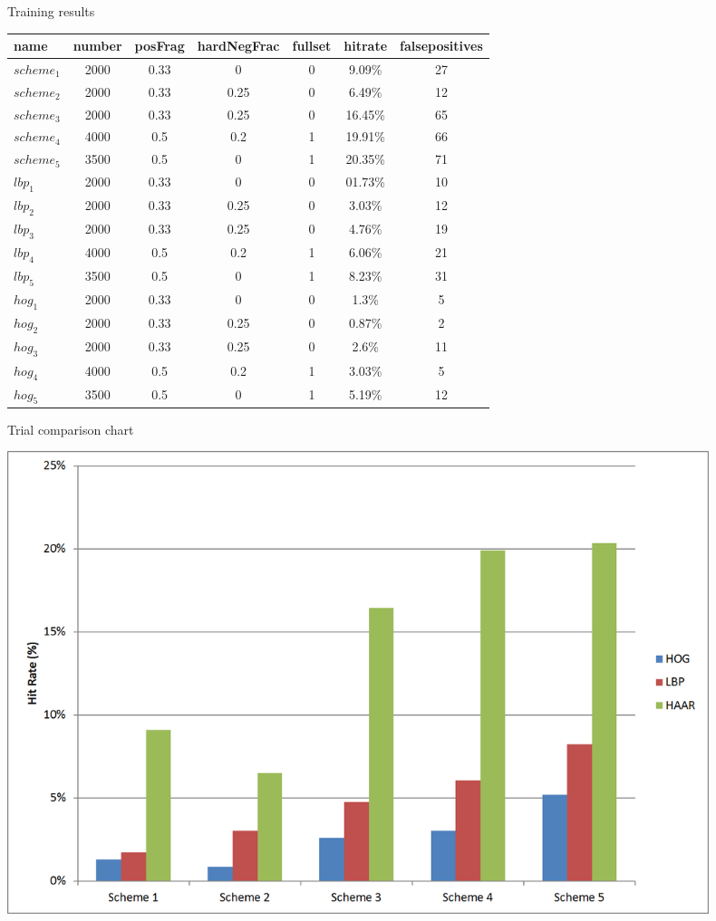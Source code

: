 \documentclass{beamer}
\begin{document}
\begin{frame}{Training results}
	\begin{table}[H]
		\footnotesize
		\centering
		\begin{tabularx}{\textwidth}{lcccccc}
			\toprule
			\textbf{name} & \textbf{number} & \textbf{posFrag} & 
			\textbf{hardNegFrac} & \textbf{fullset} &
			  \textbf{hitrate} & \textbf{falsepositives} \\
			\midrule
			\(scheme_1\) & 2000 & 0.33 	& 0 	& 0	& 9.09\% 	& 27 	\\
			\(scheme_2\) & 2000 & 0.33 	& 0.25 	& 0	& 6.49\% 	& 12 	\\
			\(scheme_3\) & 2000 & 0.33 	& 0.25 	& 0	& 16.45\% 	& 65 	\\
			\(scheme_4\) & 4000 & 0.5 	& 0.2 	& 1	& 19.91\% 	& 66 	\\
			\(scheme_5\) & 3500 & 0.5 	& 0 	& 1	& 20.35\% 	& 71 	\\
			\(lbp_1\)    & 2000 & 0.33 	& 0 	& 0	& 01.73\% 	& 10 	\\
			\(lbp_2\)    & 2000 & 0.33 	& 0.25 	& 0	& 3.03\% 	& 12 	\\
			\(lbp_3\)    & 2000 & 0.33 	& 0.25 	& 0	& 4.76\% 	& 19 	\\
			\(lbp_4\)    & 4000 & 0.5 	& 0.2 	& 1	& 6.06\% 	& 21 	\\
			\(lbp_5\)    & 3500 & 0.5 	& 0 	& 1	& 8.23\% 	& 31 	\\
			\(hog_1\)    & 2000 & 0.33 	& 0 	& 0	& 1.3\% 	& 5  	\\
			\(hog_2\)    & 2000 & 0.33 	& 0.25 	& 0	& 0.87\% 	& 2 	\\
			\(hog_3\)    & 2000 & 0.33 	& 0.25 	& 0	& 2.6\% 	& 11 	\\
			\(hog_4\)    & 4000 & 0.5 	& 0.2 	& 1	& 3.03\% 	& 5 	\\
			\(hog_5\)    & 3500 & 0.5 	& 0 	& 1	& 5.19\% 	& 12 	\\
			\bottomrule
		\end{tabularx}%
	\end{table}
\end{frame}

\begin{frame}{Trial comparison chart}
	\begin{center}
		\includegraphics[width=0.9\textwidth]{results_graph}
	\end{center}
\end{frame}
\end{document}
